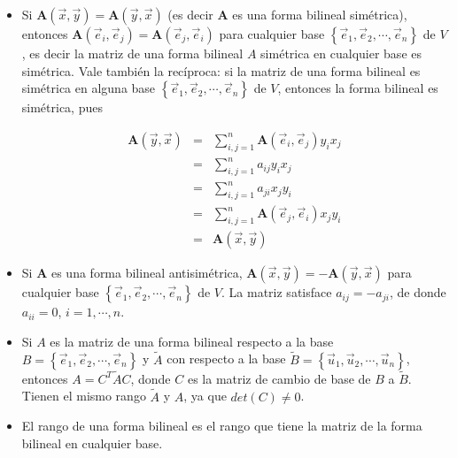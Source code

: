 \begin{remark}
\begin{itemize}
    \item 
    
    Si $\mathbf{A}(\vec{x},\vec{y})= \mathbf{A}(\vec{y},\vec{x})$ (es decir $\mathbf{A}$ es una forma bilineal simétrica), entonces 
$\mathbf{A}(\vec{e}_i,\vec{e}_j) = \mathbf{A}(\vec{e}_j,\vec{e}_i)$   para cualquier base  $\left\{\vec{e}_1,\vec{e}_2,\cdots, \vec{e}_n\right\}$ de $V$, es decir la matriz de una forma bilineal $A$ simétrica en cualquier base es simétrica. 
Vale también la recíproca: si la matriz de una forma bilineal es simétrica en alguna base 
$\left\{\vec{e}_1,\vec{e}_2,\cdots, \vec{e}_n\right\}$ de $V$, entonces la forma bilineal es simétrica, pues

\bigskip


\begin{eqnarray*}
\mathbf{A}(\vec{y},\vec{x})&=& \sum^{n}_{i,j=1} \mathbf{A}(\vec{e}_i,\vec{e}_j) y_i x_j   \\
&= &\sum^{n}_{i,j=1} a_{ij} y_i x_j   \\
&=& \sum^{n}_{i,j=1} a_{ji}  x_j y_i \\
&= &\sum^{n}_{i,j=1} \mathbf{A}(\vec{e}_j,\vec{e}_i)  x_j y_i   \\
&=& \mathbf{A}(\vec{x},\vec{y})
\end{eqnarray*}

\bigskip

\item


\bigskip
Si $\mathbf{A}$ es una forma bilineal antisimétrica, $\mathbf{A}(\vec{x},\vec{y})= -\mathbf{A}(\vec{y},\vec{x})$ para cualquier base $\left\{\vec{e}_1,\vec{e}_2,\cdots, \vec{e}_n\right\}$ de $V$. La matriz satisface $a_{ij}=-a_{ji}$, de donde $a_{ii}=0$, $i=1,   \cdots , n$.

\bigskip

\item


Si $A$ es la matriz de una forma bilineal respecto a la base  $B= \left\{\vec{e}_1,\vec{e}_2,\cdots, \vec{e}_n\right\}$ y $\tilde{A}$ con respecto a la base $\tilde{B}= \left\{\vec{u}_1,\vec{u}_2,\cdots, \vec{u}_n\right\}$, entonces $A= C^{T} \tilde{A}C$, donde $C$ es la matriz de cambio de base de $B$ a $\tilde{B}$. Tienen el mismo rango $\tilde{A}$ y $ A $, ya que $det(C) \neq 0$.

\bigskip

\item
El rango de una forma bilineal es el rango que tiene la matriz de la forma bilineal en cualquier base.

\end{itemize}

\end{remark}


